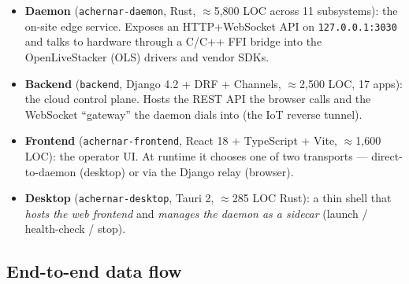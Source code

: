 \documentclass[11pt]{article}
\newcommand{\fn}[1]{\texttt{#1}}
\begin{document}
\begin{itemize}[leftmargin=1.2em]
  \item \textbf{Daemon} (\fn{achernar-daemon}, Rust, $\approx$5{,}800 LOC across 11 subsystems): the
  on-site edge service. Exposes an HTTP+WebSocket API on \texttt{127.0.0.1:3030} and talks to hardware
  through a C/C++ FFI bridge into the OpenLiveStacker (OLS) drivers and vendor SDKs.
  \item \textbf{Backend} (\fn{backend}, Django 4.2 + DRF + Channels, $\approx$2{,}500 LOC, 17 apps):
  the cloud control plane. Hosts the REST API the browser calls and the WebSocket ``gateway'' the daemon
  dials into (the IoT reverse tunnel).
  \item \textbf{Frontend} (\fn{achernar-frontend}, React 18 + TypeScript + Vite, $\approx$1{,}600 LOC):
  the operator UI. At runtime it chooses one of two transports --- direct-to-daemon (desktop) or
  via the Django relay (browser).
  \item \textbf{Desktop} (\fn{achernar-desktop}, Tauri 2, $\approx$285 LOC Rust): a thin shell that
  \emph{hosts the web frontend} and \emph{manages the daemon as a sidecar} (launch / health-check / stop).
\end{itemize}

\subsection{End-to-end data flow}
\end{document}
